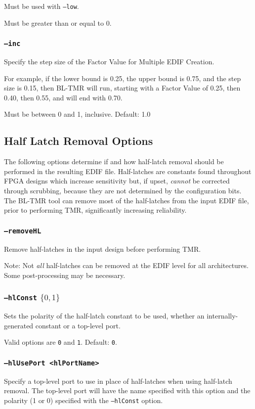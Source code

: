 \documentclass[english]{article}
\begin{document}
Must be used with \texttt{--low}.

Must be greater than or equal to 0.

\subsubsection{\texttt{--inc}}
Specify the step size of the Factor Value for Multiple EDIF Creation.

For example, if the lower bound is 0.25, the upper bound is 0.75, and the step
size is 0.15, then BL-TMR will run, starting with a Factor Value of 0.25, then
0.40, then 0.55, and will end with 0.70.

Must be between 0 and 1, inclusive. Default: 1.0

\subsection{Half Latch Removal Options}
The following options determine if and how half-latch removal should be
performed in the resulting EDIF file. Half-latches are constants found
throughout FPGA designs which increase sensitivity but, if upset, \emph{cannot}
be corrected through scrubbing, because they are not determined by the
configuration bits. The BL-TMR tool can remove most of the half-latches from the
input EDIF file, prior to performing TMR, significantly increasing reliability.

\subsubsection{\texttt{--removeHL}}
Remove half-latches in the input design before performing TMR.

Note: Not \emph{all} half-latches can be removed at the EDIF 
level for all architectures. Some post-processing may be necessary.

\subsubsection{\texttt{--hlConst} $\{0,1\}$}
Sets the polarity of the half-latch constant to be used, whether an 
internally-generated constant or a top-level port. 

Valid options are \texttt{0} and \texttt{1}. Default: \texttt{0}.

\subsubsection{\texttt{--hlUsePort <hlPortName>}}
Specify a top-level port to use in place of half-latches when 
using half-latch removal. The top-level port will have the name specified with 
this option and the polarity (1 or 0) specified with the \texttt{--hlConst} 
option.
\end{document}
